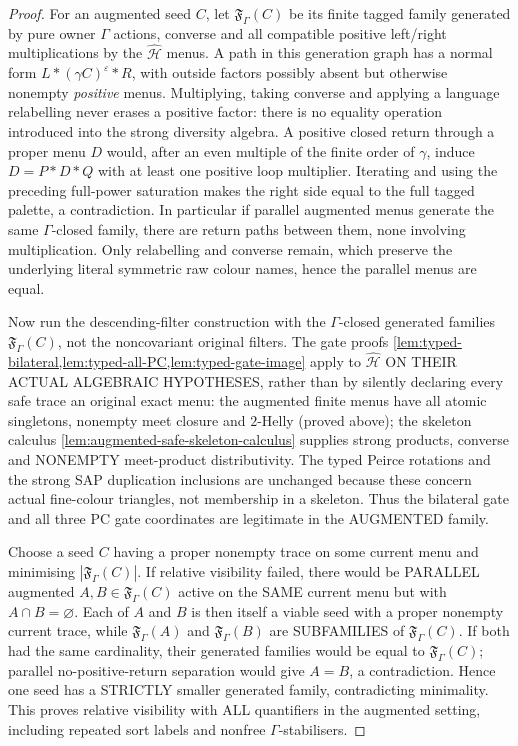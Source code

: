 \begin{proof}
For an augmented seed $C$, let $\mathfrak F_\Gamma(C)$ be its
finite tagged family generated by pure owner $\Gamma$ actions,
converse and all compatible positive left/right multiplications
by the $\widehat{\mathcal H}$ menus.  A path in this generation
graph has a normal form $L*(\gamma C)^\varepsilon*R$, with
outside factors possibly absent but otherwise nonempty
\emph{positive} menus.  Multiplying, taking converse and applying
a language relabelling never erases a positive factor: there is
no equality operation introduced into the strong diversity
algebra.  A positive closed return through a proper menu $D$
would, after an even multiple of the finite order of $\gamma$,
induce $D=P*D*Q$ with at least one positive loop multiplier.
Iterating and using the preceding full-power saturation makes
the right side equal to the full tagged palette, a contradiction.
In particular if parallel augmented menus generate the same
$\Gamma$-closed family, there are return paths between them,
none involving multiplication.  Only relabelling and converse
remain, which preserve the underlying literal symmetric raw
colour names, hence the parallel menus are equal.

Now run the descending-filter construction with the
$\Gamma$-closed generated families $\mathfrak F_\Gamma(C)$,
not the noncovariant original filters. The gate proofs
\cref{lem:typed-bilateral,lem:typed-all-PC,lem:typed-gate-image}
apply to $\widehat{\mathcal H}$ ON THEIR ACTUAL
ALGEBRAIC HYPOTHESES, rather than by silently
declaring every safe trace an original exact menu:
the augmented finite menus have all atomic singletons,
nonempty meet closure and $2$-Helly (proved above);
the skeleton calculus
\cref{lem:augmented-safe-skeleton-calculus}
supplies strong products, converse and
NONEMPTY meet-product distributivity.
The typed Peirce rotations and the strong
SAP duplication inclusions are unchanged
because these concern actual fine-colour
triangles, not membership in a skeleton.
Thus the bilateral gate and all three
PC gate coordinates are legitimate in
the AUGMENTED family.

Choose a seed $C$ having a proper
nonempty trace on some current menu and
minimising $|\mathfrak F_\Gamma(C)|$.
If relative visibility failed, there
would be PARALLEL augmented
$A,B\in\mathfrak F_\Gamma(C)$ active
on the SAME current menu but with
$A\cap B=\varnothing$.
Each of $A$ and $B$ is then itself
a viable seed with a proper nonempty
current trace, while
$\mathfrak F_\Gamma(A)$ and
$\mathfrak F_\Gamma(B)$ are
SUBFAMILIES of
$\mathfrak F_\Gamma(C)$.
If both had the same cardinality,
their generated families would be
equal to $\mathfrak F_\Gamma(C)$;
parallel no-positive-return separation
would give $A=B$, a contradiction.
Hence one seed has a STRICTLY
smaller generated family, contradicting
minimality. This proves relative
visibility with ALL quantifiers in
the augmented setting, including
repeated sort labels and nonfree
$\Gamma$-stabilisers.


\end{proof}
